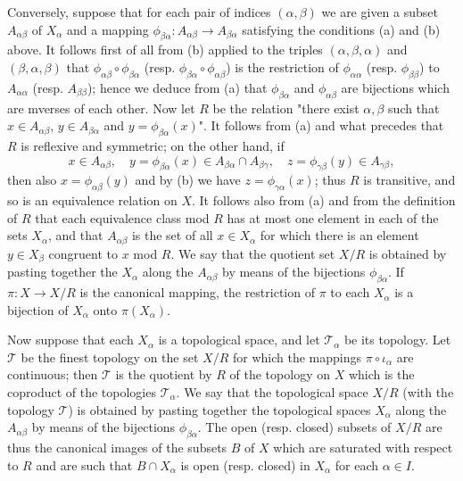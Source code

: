 Conversely, suppose that for each pair of indices $(\alpha,\beta)$ we are given a subset $A_{\alpha\beta}$ of $X_\alpha$ and a mapping $\phi_{\beta\alpha}:A_{\alpha\beta}\to A_{\beta\alpha}$ satisfying the conditions (a) and (b) above. It follows first of all from (b) applied to the triples $(\alpha,\beta,\alpha)$ and $(\beta,\alpha,\beta)$ that $\phi_{\alpha\beta}\circ\phi_{\beta\alpha}$ (resp. $\phi_{\beta\alpha}\circ\phi_{\alpha\beta}$) is the restriction of $\phi_{\alpha\alpha}$ (resp. $\phi_{\beta\beta}$) to $A_{\alpha\alpha}$ (resp. $A_{\beta\beta}$); hence we deduce from (a) that $\phi_{\beta\alpha}$ and $\phi_{\alpha\beta}$ are bijections which are mverses of each other. Now let $R$ be the relation "there exist $\alpha,\beta$ such that $x\in A_{\alpha\beta}$, $y\in A_{\beta\alpha}$ and $y=\phi_{\beta\alpha}(x)$". It follows from (a) and what precedes that $R$ is reflexive and symmetric; on the other hand, if 
\[x\in A_{\alpha\beta},\quad y=\phi_{\beta\alpha}(x)\in A_{\beta\alpha}\cap A_{\beta\gamma},\quad z=\phi_{\gamma\beta}(y)\in A_{\gamma\beta},\]
then also $x=\phi_{\alpha\beta}(y)$ and by (b) we have $z=\phi_{\gamma\alpha}(x)$; thus $R$ is transitive, and so is an equivalence relation on $X$. It follows also from (a) and from the definition of $R$ that each equivalence class mod $R$ has at most one element in each of the sets $X_\alpha$, and that $A_{\alpha\beta}$ is the set of all $x\in X_\alpha$ for which there is an element $y\in X_\beta$ congruent to $x$ mod $R$. We say that the quotient set $X/R$ is obtained by pasting together the $X_\alpha$ along the $A_{\alpha\beta}$ by means of the bijections $\phi_{\beta\alpha}$. If $\pi:X\to X/R$ is the canonical mapping, the restriction of $\pi$ to each $X_\alpha$ is a bijection of $X_\alpha$ onto $\pi(X_\alpha)$.\par
Now suppose that each $X_\alpha$ is a topological space, and let $\mathcal{T}_\alpha$ be its topology. Let $\mathcal{T}$ be the finest topology on the set $X/R$ for which the mappings $\pi\circ\iota_\alpha$ are continuous; then $\mathcal{T}$ is the quotient by $R$ of the topology on $X$ which is the coproduct of the topologies $\mathcal{T}_\alpha$. We say that the topological space $X/R$ (with the topology $\mathcal{T}$) is obtained by pasting together the topological spaces $X_\alpha$ along the $A_{\alpha\beta}$ by means of the bijections $\phi_{\beta\alpha}$. The open (resp. closed) subsets of $X/R$ are thus the canonical images of the subsets $B$ of $X$ which are saturated with respect to $R$ and are such that $B\cap X_\alpha$ is open (resp. closed) in $X_\alpha$ for each $\alpha\in I$.\par
